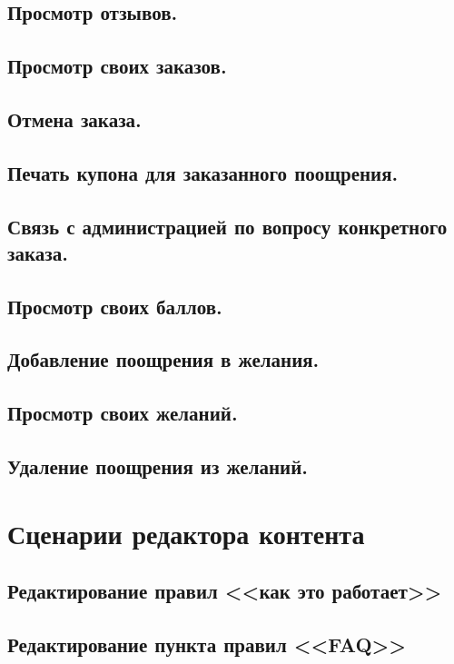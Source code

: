         \subsection{Просмотр отзывов.}
        \subsection{Просмотр своих заказов.}
        \subsection{Отмена заказа.}
        \subsection{Печать купона для заказанного поощрения.}
        \subsection{Связь с администрацией по вопросу конкретного заказа.}
        \subsection{Просмотр своих баллов.}
        \subsection{Добавление поощрения в желания.}
        \subsection{Просмотр своих желаний.}
        \subsection{Удаление поощрения из желаний.}

    \section{Сценарии редактора контента}

        \subsection{Редактирование правил <<как это работает>>}
        \subsection{Редактирование пункта правил <<FAQ>>}
